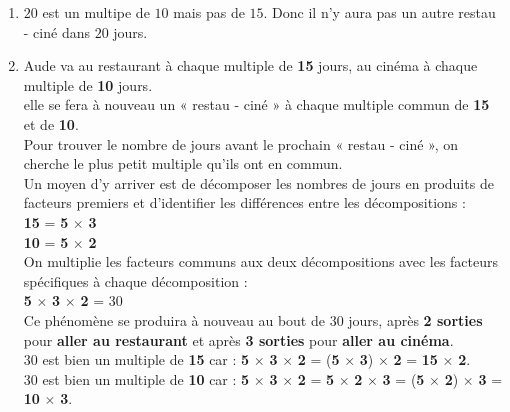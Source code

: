     \begin{enumerate}
        \item $20$ est un multipe de $10$ mais pas de $15$. Donc il n'y aura pas un autre \og restau - ciné \fg dans $20$ jours.
        \item Aude va au restaurant à chaque multiple de {\bfseries \color{red}15} jours, au cinéma à chaque multiple de {\bfseries \color{green}10} jours.\\
        elle se fera à nouveau un « restau - ciné » à chaque multiple commun de {\bfseries \color{red}15} et de {\bfseries \color{green}10}.\\
        Pour trouver le nombre de jours avant le prochain « restau - ciné », on cherche le plus petit multiple qu'ils ont en commun.\\
        Un moyen d'y arriver est de décomposer les nombres de jours en produits de facteurs premiers et d'identifier les différences entre les décompositions :\\
{\bfseries \color{red}15} = {\bfseries \color{blue}5} $\times$ {\bfseries \color{red}3} \\
        {\bfseries \color{green}10} = {\bfseries \color{blue}5} $\times$ {\bfseries \color{green}2}\\
On multiplie les facteurs communs aux deux décompositions avec les facteurs spécifiques à chaque décomposition :\\
{\bfseries \color{blue}5} $\times$ {\bfseries \color{red}3} $\times$ {\bfseries \color{green}2} = 30\\
      Ce phénomène se produira à nouveau au bout de 30 jours,
      après {\bfseries \color{green}2 sorties} pour {\bfseries \color{red}aller au restaurant} et après {\bfseries \color{red}3 sorties} pour {\bfseries \color{green}aller au cinéma}.\\
30 est bien un multiple de {\bfseries \color{red}15} car :
         {\bfseries \color{blue}5} $\times$ {\bfseries \color{red}3} $\times$ {\bfseries \color{green}2} =
         ({\bfseries \color{blue}5} $\times$ {\bfseries \color{red}3}) $\times$ {\bfseries \color{green}2} =
         {\bfseries \color{red}15} $\times$ {\bfseries \color{green}2}.\\
        30 est bien un multiple de {\bfseries \color{green}10} car :
         {\bfseries \color{blue}5} $\times$ {\bfseries \color{red}3} $\times$ {\bfseries \color{green}2} =
         {\bfseries \color{blue}5} $\times$ {\bfseries \color{green}2} $\times$ {\bfseries \color{red}3} =
         ({\bfseries \color{blue}5} $\times$ {\bfseries \color{green}2}) $\times$ {\bfseries \color{red}3} =
         {\bfseries \color{green}10} $\times$ {\bfseries \color{red}3}.\\
    \end{enumerate}


